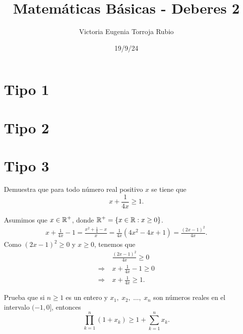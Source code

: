 \documentclass{article}
\begin{document}
\title{Matemáticas Básicas - Deberes 2}
\author{Victoria Eugenia Torroja Rubio}
\date{19/9/24}

\maketitle

\section{Tipo 1}
\section{Tipo 2}
\section{Tipo 3}

\begin{ej}
Demuestra que para todo número real positivo $\displaystyle x $ se tiene que 
\[x + \frac{1}{4x} \geq 1 .\]
\end{ej}

\begin{sol}
Asumimos que $\displaystyle x \in \mathbb{R}^{+} $, donde $\displaystyle \mathbb{R}^{+}= \left\{x \in \mathbb{R} : x \geq 0\right\} $. 
\[
\begin{split}
x + \frac{1}{4x} - 1 = \frac{x^{2}+\frac{1}{4}-x}{x} = \frac{1}{4x}\left(4x^{2} - 4x + 1\right) = \frac{\left(2x-1\right)^{2}}{4x} .
\end{split}
\]
Como $\displaystyle \left(2x-1\right)^{2}\geq 0 $ y $\displaystyle x \geq 0 $, tenemos que 
\[
\begin{split}
& \frac{\left(2x-1\right)^{2}}{4x}\geq0 \\
\Rightarrow \; & x + \frac{1}{4x}-1 \geq 0 \\
\Rightarrow \; & x + \frac{1}{4x} \geq 1 .
\end{split}
\]
\end{sol}

\begin{ej}
Prueba que si $\displaystyle n \geq 1 $ es un entero y $\displaystyle x_{1}, \; x_{2}, \; \ldots, \; x_{n} $ son números reales en el intervalo $\displaystyle (-1,0] $, entonces
\[\prod^{n}_{k=1}\left(1+x_{k}\right) \geq 1 + \sum^{n}_{k=1}x_{k} .\]
\end{ej}
\end{document}

